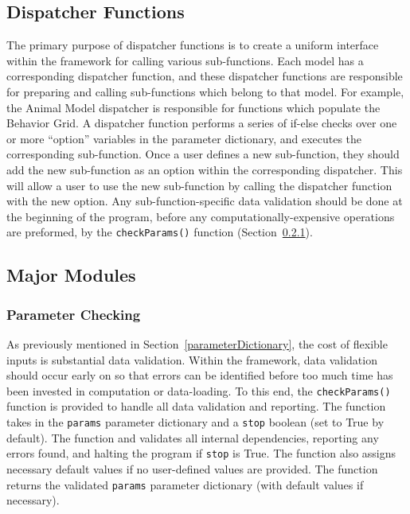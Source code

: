 \subsection{Dispatcher Functions}
\label{dispatcherFunctions}
The primary purpose of dispatcher functions is to create a uniform interface within the framework for calling various sub-functions.  Each model has a corresponding dispatcher function, and these dispatcher functions are responsible for preparing and calling sub-functions which belong to that model.  For example, the Animal Model dispatcher is responsible for functions which populate the Behavior Grid.  A dispatcher function performs a series of if-else checks over one or more ``option'' variables in the parameter dictionary, and executes the corresponding sub-function.  Once a user defines a new sub-function, they should add the new sub-function as an option within the corresponding dispatcher.  This will allow a user to use the new sub-function by calling the dispatcher function with the new option.  Any sub-function-specific data validation should be done at the beginning of the program, before any computationally-expensive operations are preformed, by the \texttt{checkParams()} function (Section~\ref{checkParams}).


\subsection{Major Modules}
\label{majorModules}
\subsubsection{Parameter Checking}
\label{checkParams}
As previously mentioned in Section~\ref{parameterDictionary}, the cost of flexible inputs is substantial data validation.  Within the framework, data validation should occur early on so that errors can be identified before too much time has been invested in computation or data-loading.  To this end, the \texttt{checkParams()} function is provided to handle all data validation and reporting.  The function takes in the \texttt{params} parameter dictionary and a \texttt{stop} boolean (set to True by default).  The function and validates all internal dependencies, reporting any errors found, and halting the program if \texttt{stop} is True.  The function also assigns necessary default values if no user-defined values are provided.  The function returns the validated \texttt{params} parameter dictionary (with default values if necessary).  

